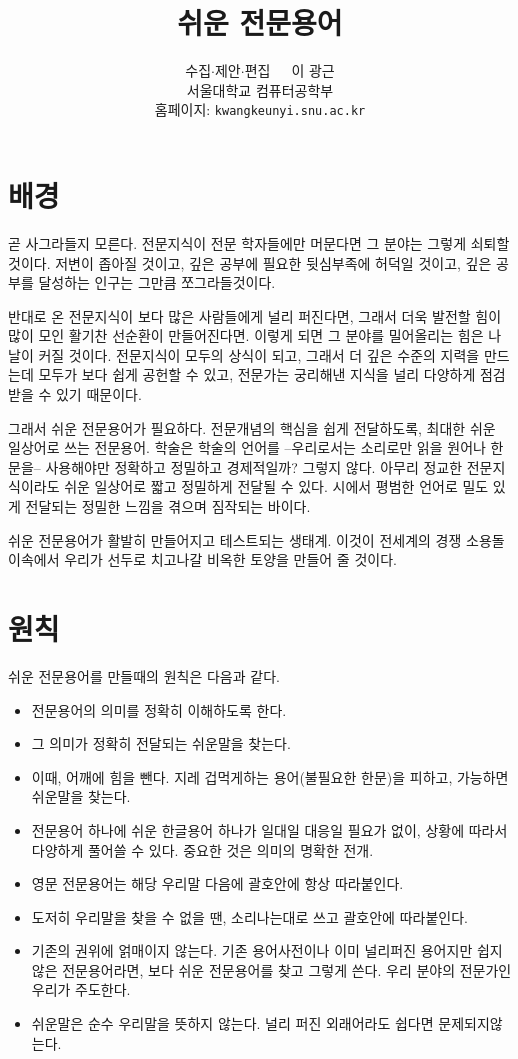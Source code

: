 \documentclass[11pt]{article}
\title{쉬운 전문용어}
\author{수집\(\cdot\)제안\(\cdot\)편집\ \ \  이 광근\\
  서울대학교 컴퓨터공학부\\
  홈페이지: \texttt{kwangkeunyi.snu.ac.kr}
}
\date{}
\begin{document}
\maketitle

\section*{배경}
곧 사그라들지 모른다. 전문지식이 전문 학자들에만 머문다면 그 분야는
그렇게 쇠퇴할 것이다. 저변이 좁아질 것이고, 깊은 공부에 필요한
뒷심부족에 허덕일 것이고, 깊은 공부를 달성하는 인구는 그만큼
쪼그라들것이다.

반대로 온 전문지식이 보다 많은 사람들에게 널리 퍼진다면, 그래서 더욱
발전할 힘이 많이 모인 활기찬 선순환이 만들어진다면. 이렇게 되면 그
분야를 밀어올리는 힘은 나날이 커질 것이다. 전문지식이 모두의 상식이
되고, 그래서 더 깊은 수준의 지력을 만드는데 모두가 보다 쉽게 공헌할 수
있고, 전문가는 궁리해낸 지식을 널리 다양하게 점검받을 수 있기
때문이다.

그래서 쉬운 전문용어가 필요하다. 전문개념의 핵심을 쉽게 전달하도록,
최대한 쉬운 일상어로 쓰는 전문용어. 학술은 학술의 언어를
--우리로서는 소리로만 읽을 원어나 한문을-- 사용해야만 정확하고
정밀하고 경제적일까? 그렇지 않다. 아무리 정교한 전문지식이라도 쉬운
일상어로 짧고 정밀하게 전달될 수 있다. 시에서 평범한 언어로 밀도 있게
전달되는 정밀한 느낌을 겪으며 짐작되는 바이다.

쉬운 전문용어가 활발히 만들어지고 테스트되는 생태계. 이것이
전세계의 경쟁 소용돌이속에서 우리가 선두로 치고나갈 비옥한 토양을 만들어 줄 것이다.

\section*{원칙}
쉬운 전문용어를 만들때의 원칙은 다음과 같다.
\begin{itemize}
\item 전문용어의 의미를 정확히 이해하도록 한다.
\item 그 의미가 정확히 전달되는 쉬운말을 찾는다.
\item 이때, 어깨에 힘을 뺀다. 지레 겁먹게하는 용어(불필요한 한문)을 피하고, 가능하면
  쉬운말을 찾는다. 
\item 전문용어 하나에 쉬운 한글용어 하나가 일대일 대응일 필요가 없이,
  상황에 따라서 다양하게 풀어쓸 수 있다. 중요한 것은 의미의 명확한
  전개.
\item 영문 전문용어는 해당 우리말 다음에 괄호안에 항상 따라붙인다.
\item 도저히 우리말을 찾을 수 없을 땐, 소리나는대로 쓰고 괄호안에
  따라붙인다. 
\item 기존의 권위에 얽매이지 않는다. 기존 용어사전이나 이미 널리퍼진
  용어지만 쉽지않은 전문용어라면, 보다 쉬운 전문용어를 찾고 그렇게
  쓴다. 우리 분야의 전문가인 우리가 주도한다.
\item 쉬운말은 순수 우리말을 뜻하지 않는다. 널리 퍼진 외래어라도
  쉽다면 문제되지않는다.
\end{itemize}



\printindex
\end{document}
